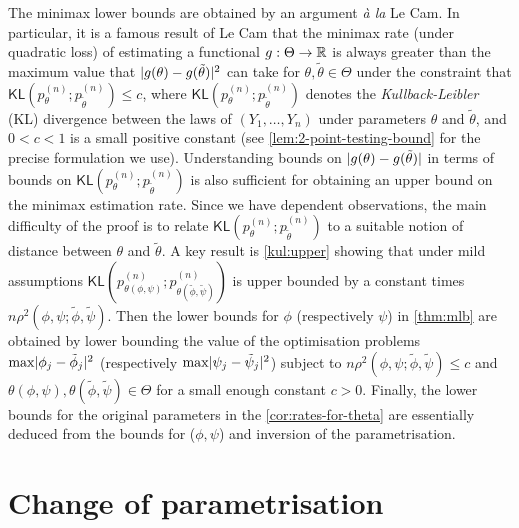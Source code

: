 \documentclass[journal]{IEEEtran}
\newcommand{\1}{\boldsymbol{1}}
\newcommand{\KL}{\mathsf{KL}}
\DeclarePairedDelimiter{\abs}{\lvert}{\rvert}
\begin{document}
	The minimax lower bounds are obtained by an argument \textit{à la} Le Cam. In
	particular, it is a famous result of Le Cam \cite{cam:1986,tsybakov:2009} that the minimax rate (under
	quadratic loss) of estimating a functional $g : \Theta \to \mathbb{R}$ is always greater
	than the maximum value that $\abs{g(\theta) - g(\tilde{\theta})}^2$ can take for $\theta,\tilde{\theta} \in \Theta$  under the constraint that
	$\KL(p_{\theta}^{(n)};p_{\tilde{\theta}}^{(n)}) \leq c$, where
	$\KL(p_{\theta}^{(n)};p_{\tilde{\theta}}^{(n)})$ denotes the \textit{Kullback-Leibler} (KL)
	divergence between the laws of $(Y_1,\dots,Y_n)$ under parameters $\theta$ and
	$\tilde{\theta}$, and $0 < c< 1$ is a small positive constant (see \cref{lem:2-point-testing-bound} for the precise formulation we use).
	Understanding bounds on $\abs{g(\theta)-g(\tilde{\theta})}$ in terms of bounds on $\KL(p_{\theta}^{(n)};p_{\tilde{\theta}}^{(n)})$ is also sufficient for obtaining an upper bound on the minimax estimation rate. Since we have dependent observations, the main difficulty of the proof is to relate $\KL(p_{\theta}^{(n)};p_{\tilde{\theta}}^{(n)})$ to
	a suitable notion of distance between $\theta$ and $\tilde{\theta}$. A key result is \cref{kul:upper} showing that under mild assumptions
	$\KL(p_{\theta(\phi,\psi)}^{(n)};p_{\theta(\tilde{\phi},\tilde{\psi})}^{(n)})$ is upper bounded by a constant times $n \rho^2 (\phi,\psi;\tilde{\phi},\tilde{\psi})$.  Then the lower bounds for
	$\phi$ (respectively $\psi$) in \cref{thm:mlb} are obtained by lower bounding
	the value of the optimisation problems $\max\abs{\phi_j - \tilde{\phi}_j}^2$ (respectively
	$\max\abs{\psi_j - \tilde{\psi}_j}^2$) subject to $n \rho^2 (\phi,\psi;\tilde{\phi},\tilde{\psi}) \leq c$ and
	$\theta(\phi,\psi),\theta(\tilde{\phi},\tilde{\psi})\in \Theta$ for a small enough constant $c > 0$. Finally,
	the lower bounds for the original parameters in the
	\cref{cor:rates-for-theta} are essentially deduced from the bounds for
	($\phi,\psi$) and inversion of the parametrisation.



	\section{Change of parametrisation}
	\label{sec:change-param}
\end{document}
